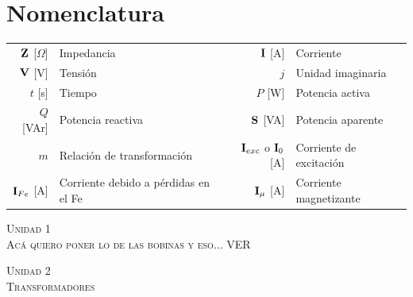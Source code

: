 \documentclass[11pt,a4paper]{article}
\newcommand{\fasor}[1]{\uppercase{\textbf{#1}}}
\newcommand{\unidad}[2]{\begin{center}
		\fontsize{10}{10}\selectfont\color{gray!50!black}\scshape Unidad #1 \\
		\fontsize{14}{14}\selectfont \scshape #2
	\end{center} \vspace{-.6cm}}
\begin{document}
	\pagestyle{fancy}
	\section*{Nomenclatura}
	\begin{tabular}{r l r l}
		$\fasor{Z}$ [$\Omega$]& Impedancia &
		$\fasor{i}$ [A] & Corriente \\
		$\fasor{v}$ [V] & Tensión&
		$j$ & Unidad imaginaria \\
		$t$ [s] & Tiempo &
		$P$ [W] & Potencia activa \\
		$Q$ [VAr] & Potencia reactiva &
		$\fasor{s}$ [VA] & Potencia aparente \\
		$m$ & Relación de transformación&
		$\fasor{I}_{exc}$ o $\fasor{I}_0$ [A] & Corriente de excitación\\
		$\fasor{I}_{Fe}$ [A] & Corriente debido a pérdidas en el Fe&
		$\fasor{I}_{\mu}$ [A] & Corriente magnetizante\\
	\end{tabular}
	\unidad{1}{Acá quiero poner lo de las bobinas y eso... VER}
	\unidad{2}{Transformadores}
	
\end{document}
